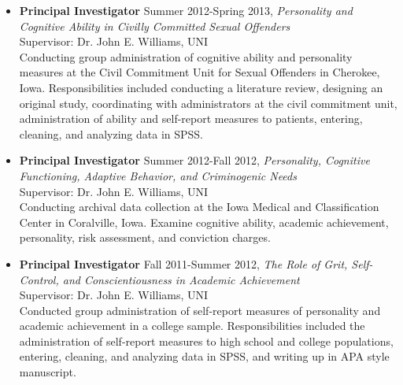 \documentclass[letterpaper,10pt]{article}
\begin{document}
\begin{itemize}
%
\item \textbf{Principal Investigator} {Summer 2012-Spring 2013, \emph{Personality and Cognitive Ability in Civilly Committed Sexual Offenders}}\\
Supervisor: Dr. John E. Williams, UNI\\
Conducting group administration of cognitive ability and personality measures at the Civil Commitment Unit for Sexual Offenders in Cherokee, Iowa. Responsibilities included conducting a literature review, designing an original study, coordinating with administrators at the civil commitment unit, administration of ability and self-report measures to patients, entering, cleaning, and analyzing data in SPSS.
%
\item \textbf{Principal Investigator} {Summer 2012-Fall 2012, \emph{Personality, Cognitive Functioning, Adaptive Behavior, and Criminogenic Needs}}\\
Supervisor: Dr. John E. Williams, UNI\\
Conducting archival data collection at the Iowa Medical and Classification Center in 	Coralville, Iowa. Examine cognitive ability, academic achievement, personality, risk assessment, and conviction charges. 
%
\item \textbf{Principal Investigator} {Fall 2011-Summer 2012, \emph{The Role of Grit, Self-Control, and Conscientiousness in Academic Achievement}}\\
Supervisor: Dr. John E. Williams, UNI\\
Conducted group administration of self-report measures of personality and academic achievement in a college sample. Responsibilities included the administration of self-report measures to high school and college populations, entering, cleaning, and analyzing data in SPSS, and writing up in APA style manuscript. 
%
%


\end{itemize}
\end{document}
